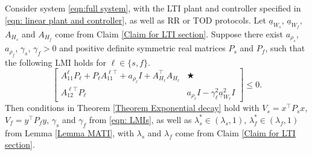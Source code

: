 \begin{prop}
    Consider system \eqref{eqn:full system}, with the LTI plant and controller specified in \eqref{eqn: linear plant and controller}, as well as RR or TOD protocols. Let $\underline{a}_{W_s}$, $\underline{a}_{W_f}$, $A_{H_s}$ and $A_{H_f}$ come from Claim \ref{Claim for LTI section}. Suppose there exist $a_{\rho_s}$, $a_{\rho_f}$, $\gamma_s$, $\gamma_f > 0$ and positive definite symmetric real matrices $P_s$ and $P_f$, such that the following LMI holds for $\ell \in \{s, f\}$.
%
    \begin{equation}
        \left[\begin{smallmatrix}
        A_{11}^{\ell} P_\ell + P_\ell A_{11}^{\ell\top} + a_{\rho_\ell} I + A_{H_\ell}^\top A_{H_\ell} &  \bigstar  \\
        A_{12}^{\ell\top} P_\ell & a_{\rho_\ell} I - \gamma_\ell^2 \underline{a}_{W_\ell}^2 I
        \end{smallmatrix}\right]
        \leq 0 .
        \label{eqn: LMIs}
    \end{equation}
    Then conditions in Theorem \ref{Theorem Exponential decay} hold with $V_s = x^\top P_s x$, $V_f = y^\top P_f y$, $\gamma_s$ and $\gamma_f$ from \eqref{eqn: LMIs}, as well as $\lambda_s^* \in (\lambda_s, 1)$, $\lambda_f^* \in (\lambda_f,1)$ from Lemma \ref{Lemma MATI}, with $\lambda_s$ and $\lambda_f$ come from Claim \ref{Claim for LTI section}.
    \label{Proposition LTI}  
\end{prop}
